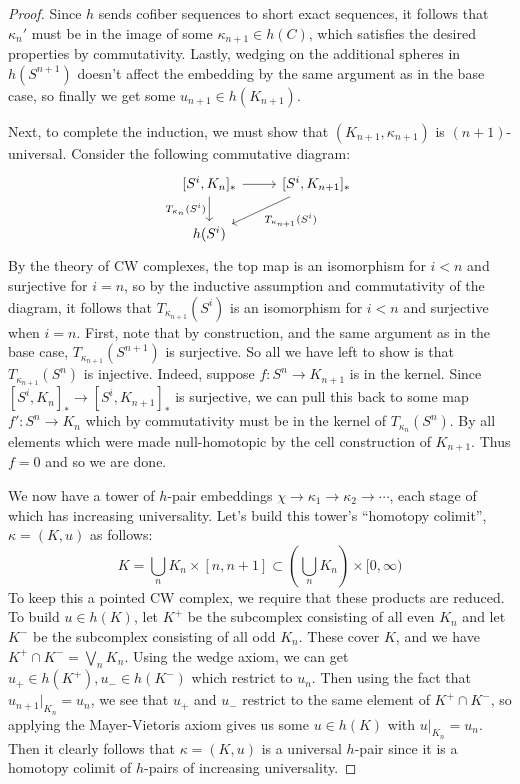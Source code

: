 \documentclass[11pt,letterpaper]{article}
\begin{document}
\begin{proof}
    Since $h$ sends cofiber sequences to short exact sequences, it follows that $\kappa_n'$ must be in the image of some $\kappa_{n+1} \in h(C)$, which satisfies the desired properties by commutativity.
    Lastly, wedging on the additional spheres in $h(S^{n+1})$ doesn't affect the embedding by the same argument as in the base case, so finally we get some $u_{n+1}\in h(K_{n+1})$.

    Next, to complete the induction, we must show that $(K_{n+1}, \kappa_{n+1})$ is $(n+1)$-universal. Consider the following commutative diagram:
    \[\begin{tikzcd}
	    {[S^i,K_n]_*} & {[S^i,K_{n+1}]_*} \\
	    {h(S^i)}
	    \arrow["{T_{\kappa_n}(S^i)}"', from=1-1, to=2-1]
	    \arrow["{T_{\kappa_{n+1}}(S^i)}", from=1-2, to=2-1]
	    \arrow[from=1-1, to=1-2]
    \end{tikzcd}\]
    By the theory of CW complexes, the top map is an isomorphism for $i < n$ and surjective for $i = n$, so by the inductive assumption and commutativity of the diagram, it follows that $T_{\kappa_{n+1}}(S^i)$ is an isomorphism for $i< n$ and surjective when $i=n$. First, note that by construction, and the same argument as in the base case, $T_{\kappa_{n+1}}(S^{n+1})$ is surjective. So all we have left to show is that $T_{\kappa_{n+1}}(S^n)$ is injective. Indeed, suppose $f : S^n \to K_{n+1}$ is in the kernel. Since $[S^i, K_n]_* \to [S^i, K_{n+1}]_*$ is surjective, we can pull this back to some map $f' : S^n \to K_n$ which by commutativity must be in the kernel of $T_{\kappa_n}(S^n)$. By all elements which were made null-homotopic by the cell construction of $K_{n+1}$. Thus $f=0$ and so we are done.
    
    We now have a tower of $h$-pair embeddings $\chi \to \kappa_1 \to \kappa_2 \to \cdots$, each stage of which has increasing universality. Let's build this tower's ``homotopy colimit'', $\kappa = (K, u)$ as follows:
    \[
        K = \bigcup_n K_n\times [n, n+1] \subset \left(\bigcup_n K_n\right)\times [0, \infty)
    \]
    To keep this a pointed CW complex, we require that these products are reduced. To build $u\in h(K)$, let $K^+$ be the subcomplex consisting of all even $K_n$ and let $K^-$ be the subcomplex consisting of all odd $K_n$. These cover $K$, and we have $K^+\cap K^- = \bigvee_n K_n$. Using the wedge axiom, we can get $u_+\in h(K^+), u_-\in h(K^-)$ which restrict to $u_n$. Then using the fact that $u_{n+1}|_{K_n} = u_n$, we see that $u_+$ and $u_-$ restrict to the same element of $K^+\cap K^-$, so applying
    the Mayer-Vietoris axiom gives us some $u\in h(K)$ with $u|_{K_n} = u_n$. Then it clearly follows that $\kappa= (K,u)$ is a universal $h$-pair since it is a homotopy colimit of $h$-pairs of increasing universality.
\end{proof}
\end{document}
